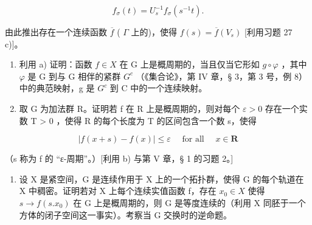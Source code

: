 \[
f _ {\sigma} (t) = U _ {s} ^ {- 1} f _ {\sigma} (s ^ {- 1} t).
\]

由此推出存在一个连续函数 \(\overline{f}\) ( \(\Gamma\) 上的)，使得 \(f(s) = \overline{f}(V_s)\) {[}利用习题 27 c){]}。

\begin{enumerate}
\def\labelenumi{\alph{enumi})}
\setcounter{enumi}{1}
\tightlist
\item
  利用 a) 证明：函数 \(f \in X\) 在 G 上是概周期的，当且仅当它形如 \(g \circ \varphi\) ，其中 \(\varphi\) 是 G 到与 G 相伴的紧群 \(G^{c}\) （《集合论》，第 IV 章，§ 3，第 3 号，例 8）中的典范映射，g 是 \(G^{c}\) 到 C 中的一个连续映射。
\item
  取 G 为加法群 R。证明若 f 在 R 上是概周期的，则对每个 \(\varepsilon > 0\) 存在一个实数 T \textgreater{} 0 ，使得 R 的每个长度为 T 的区间包含一个数 s，使得
\end{enumerate}

\[
\left| f (x + s) - f (x) \right| \leqslant \varepsilon \quad \text { for   all } \quad x \in \mathbf {R}
\]

（s 称为 f 的 “ε-周期”。）{[}利用 b) 与第 V 章，§ 1 的习题 2。{]}

\begin{enumerate}
\def\labelenumi{\arabic{enumi})}
\setcounter{enumi}{28}
\tightlist
\item
  设 X 是紧空间，G 是连续作用于 X 上的一个拓扑群，使得 G 的每个轨道在 X 中稠密。证明若对 X 上每个连续实值函数 f，存在 \(x_{0} \in X\) 使得 \(s \to f(s.x_{0})\) 在 G 上是概周期的，则 G 是等度连续的（利用 X 同胚于一个方体的闭子空间这一事实）。考察当 G 交换时的逆命题。
\end{enumerate}
\relax{}
